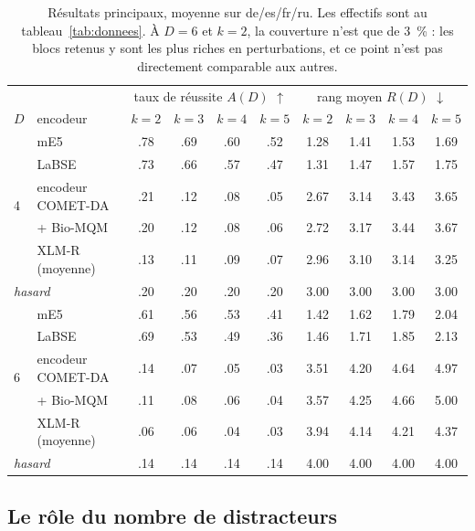 \documentclass[11pt]{article}
\begin{document}
\begin{table}[t]
\centering\small
\begin{tabular}{ll cccc cccc}
\toprule
& & \multicolumn{4}{c}{taux de réussite $A(D)$ $\uparrow$} & \multicolumn{4}{c}{rang moyen $R(D)$ $\downarrow$}\\
\cmidrule(lr){3-6}\cmidrule(lr){7-10}
$D$ & encodeur & $k{=}2$ & $k{=}3$ & $k{=}4$ & $k{=}5$ & $k{=}2$ & $k{=}3$ & $k{=}4$ & $k{=}5$\\
\midrule
\multirow{5}{*}{4}
 & mE5              & .78 & .69 & .60 & .52 & 1.28 & 1.41 & 1.53 & 1.69\\
 & LaBSE            & .73 & .66 & .57 & .47 & 1.31 & 1.47 & 1.57 & 1.75\\
 & encodeur COMET-DA& .21 & .12 & .08 & .05 & 2.67 & 3.14 & 3.43 & 3.65\\
 & \quad + Bio-MQM  & .20 & .12 & .08 & .06 & 2.72 & 3.17 & 3.44 & 3.67\\
 & XLM-R (moyenne)  & .13 & .11 & .09 & .07 & 2.96 & 3.10 & 3.14 & 3.25\\
\cmidrule(lr){1-10}
\multicolumn{2}{l}{\emph{hasard}} & .20 & .20 & .20 & .20 & 3.00 & 3.00 & 3.00 & 3.00\\
\midrule
\multirow{5}{*}{6}
 & mE5              & .61 & .56 & .53 & .41 & 1.42 & 1.62 & 1.79 & 2.04\\
 & LaBSE            & .69 & .53 & .49 & .36 & 1.46 & 1.71 & 1.85 & 2.13\\
 & encodeur COMET-DA& .14 & .07 & .05 & .03 & 3.51 & 4.20 & 4.64 & 4.97\\
 & \quad + Bio-MQM  & .11 & .08 & .06 & .04 & 3.57 & 4.25 & 4.66 & 5.00\\
 & XLM-R (moyenne)  & .06 & .06 & .04 & .03 & 3.94 & 4.14 & 4.21 & 4.37\\
\cmidrule(lr){1-10}
\multicolumn{2}{l}{\emph{hasard}} & .14 & .14 & .14 & .14 & 4.00 & 4.00 & 4.00 & 4.00\\
\bottomrule
\end{tabular}
\caption{Résultats principaux, moyenne sur de/es/fr/ru. Les effectifs sont au tableau~\ref{tab:donnees}. À $D{=}6$ et $k{=}2$, la couverture n'est que de 3~\% : les blocs retenus y sont les plus riches en perturbations, et ce point n'est pas directement comparable aux autres.}
\label{tab:principal}
\end{table}

\subsection{Le rôle du nombre de distracteurs}
\end{document}
